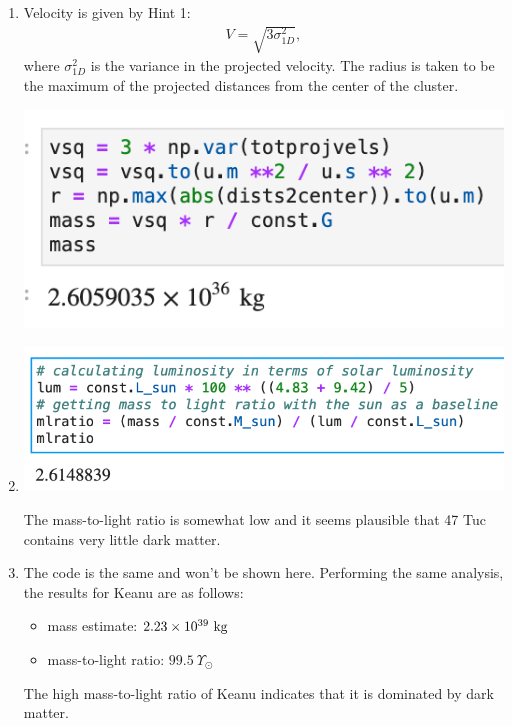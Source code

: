 \documentclass[11pt,letterpaper]{article}
\begin{document}
\begin{enumerate}[label=(\roman*)]
    \item Velocity is given by Hint 1:
        \begin{align*}
            V = \sqrt{3\sigma_{1D}^2},
        \end{align*}
        where $\sigma_{1D}^2$ is the variance in the projected velocity. The radius is taken to be the maximum of the projected distances from the center of the cluster. 

        \begin{parbox}{\linewidth}{
                \centering
                \includegraphics[width=0.5\linewidth]{figures/q24.png}
        }\end{parbox}

    \item \hfill

        \begin{parbox}{\linewidth}{
                \centering
                \includegraphics[width=0.75\linewidth]{figures/q25.png}
            }
        \end{parbox}

        The mass-to-light ratio is somewhat low and it seems plausible that 47 Tuc contains very little dark matter. 

    \item The code is the same and won't be shown here. Performing the same analysis, the results for Keanu are as follows:
        \begin{itemize}
            \item mass estimate: $2.23\times 10^{39}~{\rm kg}$
            \item mass-to-light ratio: $99.5~\Upsilon_\odot$
        \end{itemize}
        The high mass-to-light ratio of Keanu indicates that it is dominated by dark matter. 

\end{enumerate}
\end{document}
